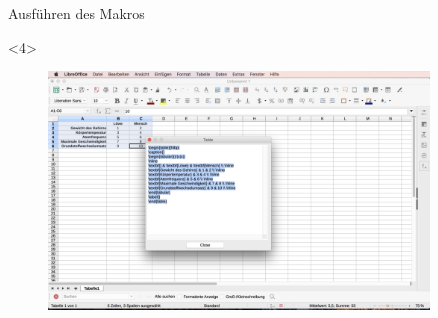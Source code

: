 \begin{frame}[c]{Ausführen des Makros}
\begin{onlyenv}
\begin{figure}[htbp]
		\end{figure}
	\end{onlyenv}
	\begin{onlyenv}
		\begin{figure}[htbp]
			\centering
			\includegraphics[width=0.9\textwidth]{img/Bildschirmfoto_mitKasten/3_Tabelle/7.jpg}
		\end{figure}
	\end{onlyenv}
\end{frame}
